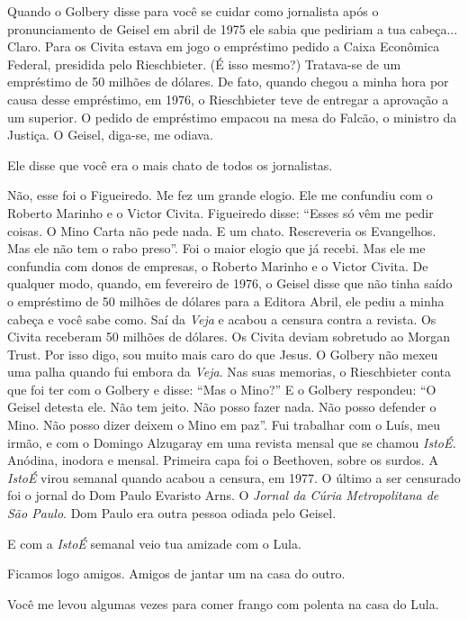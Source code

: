 \falaG Quando o Golbery disse para você se cuidar como jornalista após o
pronunciamento de Geisel em abril de 1975 ele sabia que pediriam a tua
cabeça... \falaM Claro. Para os Civita estava em jogo o empréstimo pedido a
Caixa Econômica Federal, presidida pelo Rieschbieter. (É isso mesmo?)
Tratava-se de um empréstimo de 50 milhões de dólares. De fato, quando
chegou a minha hora por causa desse empréstimo, em 1976, o Rieschbieter
teve de entregar a aprovação a um superior. O pedido de empréstimo
empacou na mesa do Falcão, o ministro da Justiça. O Geisel, diga-se, me
odiava.

\falaG Ele disse que você era o mais chato de todos os jornalistas.

\falaM Não, esse foi o Figueiredo. Me fez um grande elogio. Ele me confundiu
com o Roberto Marinho e o Victor Civita. Figueiredo disse: ``Esses só
vêm me pedir coisas. O Mino Carta não pede nada. E um chato. Rescreveria
os Evangelhos. Mas ele não tem o rabo preso''. Foi o maior elogio que já
recebi. Mas ele me confundia com donos de empresas, o Roberto Marinho e
o Victor Civita. De qualquer modo, quando, em fevereiro de 1976, o
Geisel disse que não tinha saído o empréstimo de 50 milhões de dólares
para a Editora Abril, ele pediu a minha cabeça e você sabe como. Saí da
\emph{Veja} e acabou a censura contra a revista. Os Civita receberam 50
milhões de dólares. Os Civita deviam sobretudo ao Morgan Trust. Por isso
digo, sou muito mais caro do que Jesus. O Golbery não mexeu uma palha
quando fui embora da \emph{Veja}. Nas suas memorias, o Rieschbieter
conta que foi ter com o Golbery e disse: ``Mas o Mino?'' E o Golbery
respondeu: ``O Geisel detesta ele. Não tem jeito. Não posso fazer nada.
Não posso defender o Mino. Não posso dizer deixem o Mino em paz''. Fui
trabalhar com o Luís, meu irmão, e com o Domingo Alzugaray em uma
revista mensal que se chamou \emph{IstoÉ.} Anódina, inodora e mensal.
Primeira capa foi o Beethoven, sobre os surdos. A \emph{IstoÉ} virou
semanal quando acabou a censura, em 1977. O último a ser censurado foi o
jornal do Dom Paulo Evaristo Arns. O \emph{Jornal da Cúria Metropolitana
de São Paulo}. Dom Paulo era outra pessoa odiada pelo Geisel.

\falaG E com a \emph{IstoÉ} semanal veio tua amizade com o Lula.

\falaM Ficamos logo amigos. Amigos de jantar um na casa do outro.

\falaG Você me levou algumas vezes para comer frango com polenta na casa do
Lula.

